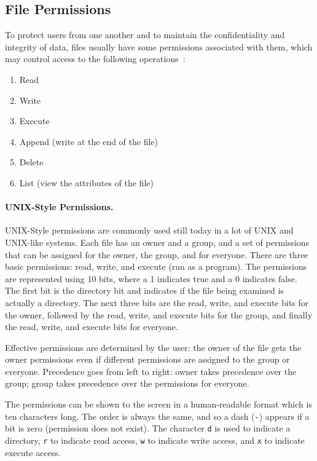 \subsection*{File Permissions}
To protect users from one another and to maintain the confidentiality and integrity of data, files usually have some permissions associated with them, which may control access to the following operations~\cite{osc}:

\begin{enumerate}
	\item Read
	\item Write
	\item Execute
	\item Append (write at the end of the file)
	\item Delete
	\item List (view the attributes of the file)
\end{enumerate}

\paragraph{UNIX-Style Permissions.}
UNIX-Style permissions are commonly used still today in a lot of UNIX and UNIX-like systems. Each file has an owner and a group, and a set of permissions that can be assigned for the owner, the group, and for everyone. There are three basic permissions: read, write, and execute (run as a program). The permissions are represented using 10 bits, where a 1 indicates true and a 0 indicates false. The first bit is the directory bit and indicates if the file being examined is actually a directory. The next three bits are the read, write, and execute bits for the owner, followed by the read, write, and execute bits for the group, and finally the read, write, and execute bits for everyone.

Effective permissions are determined by the user: the owner of the file gets the owner permissions even if different permissions are assigned to the group or everyone. Precedence goes from left to right: owner takes precedence over the group; group takes precedence over the permissions for everyone.

The permissions can be shown to the screen in a human-readable format which is ten characters long. The order is always the same, and so a dash (\texttt{-}) appears if a bit is zero (permission does not exist). The character \texttt{d} is used to indicate a directory, \texttt{r} to indicate read access, \texttt{w} to indicate write access, and \texttt{x} to indicate execute access.

